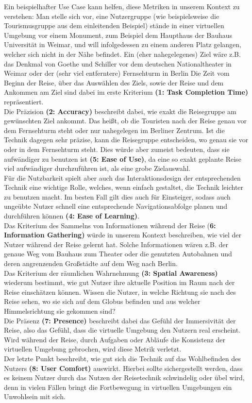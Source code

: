 Ein beispielhafter Use Case kann helfen, diese Metriken in unserem Kontext zu verstehen:
Man stelle sich vor, eine Nutzergruppe (wie beispielsweise die Tourismusgruppe aus dem einleitenden Beispiel) stände in einer virtuellen Umgebung vor einem Monument, zum Beispiel dem Haupthaus der Bauhaus Universität in Weimar, und will infolgedessen zu einem anderen Platz gelangen, welcher sich nicht in der Nähe befindet. Ein (eher nahegelegenes) Ziel wäre z.B. das Denkmal von Goethe und Schiller vor dem deutschen Nationaltheater in Weimar oder der (sehr viel entferntere) Fernsehturm in Berlin
Die Zeit vom Beginn der Reise, über das Auswählen des Ziels, sowie der Reise und dem Ankommen am Ziel sind dabei im erste Kriterium \textbf{(1: Task Completion Time)} repräsentiert.\\
Die Präzision \textbf{(2: Accuracy)} beschreibt dabei, wie exakt die Reisegruppe am gewünschten Ziel ankommt. Das heißt, ob die \glqq Touristen\grqq{} nach der Reise genau vor dem Fernsehturm steht oder nur nahegelegen im Berliner Zentrum. Ist die Technik dagegen sehr präzise, kann die Reisegruppe entscheiden, wo genau sie vor oder in dem Fernsehturm steht. Dies würde aber zumeist bedeuten, dass sie aufwändiger zu benutzen ist \textbf{(5: Ease of Use)}, da eine so exakt geplante Reise viel aufwändiger durchzuführen ist, als eine grobe Zielauswahl.\\
Für die Nutzbarkeit spielt aber auch das Interaktionsdesign der entsprechenden Technik eine wichtige Rolle, welches, wenn einfach gestaltet, die Technik leichter zu benutzen macht. Im besten Fall gilt dies auch für Einsteiger, sodass auch ungeübte Nutzer schnell eine entsprechende Navigationsabfolge planen und durchführen können \textbf{(4: Ease of Learning)}.\\
Das Kriterium des Sammelns von Informationen während der Reise (\textbf{6: Information Gathering)} würde in unserem Kontext beschreiben, wie viel der Nutzer während der Reise gelernt hat. Solche Informationen wären z.B. der genaue Weg vom Bauhaus zum Theater oder die genutzten Autobahnen und deren angrenzenden Großstädte auf dem Weg nach Berlin.\\
Das Kriterium der räumlichen Wahrnehmung \textbf{(3: Spatial Awareness)} wiederum bestimmt, wie gut Nutzer ihre aktuelle Position im Raum nach der Reise einschätzen können. Wissen die Nutzer, in welche Richtung sie nach des Reise sehen, wo sie sich auf dem Globus befinden und aus welcher Himmelsrichtung sie gekommen sind?\\
Die Präsenz \textbf{(7: Presence)} beschreibt dabei das Gefühl der Immersivität der Reise, also das Gefühl, dass die virtuelle Umgebung den Nutzern real erscheint. Wird während der Reise, durch Aufgaben oder Abläufe die Konsistenz der virtuellen Umgebung gebrochen, wird diese Metrik verletzt.\\
Der letzte Punkt beschreibt, wie gut sich die Technik auf das Wohlbefinden des Nutzers \textbf{(8: User Comfort)} auswirkt. Hierbei sollte sichergestellt werden, dass es keinem Nutzer durch das Nutzen der Reisetechnik schwindelig oder übel wird, denn in vielen Fällen bringt die Fortbewegung in virtuellen Umgebungen ein Unwohlsein mit sich.

